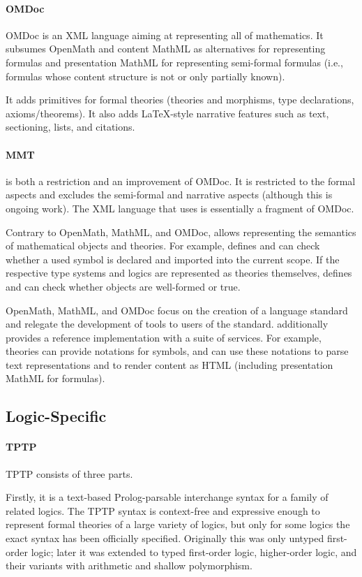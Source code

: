 \documentclass[12pt]{article}
\newcommand{\system}[2][]{\paragraph{#2}#2 \ifnonempty[\cite{#2}]{#1}{\cite{#1}}}
\begin{document}
\system{OMDoc} is an XML language aiming at representing all of mathematics.
It subsumes OpenMath and content MathML as alternatives for representing formulas and presentation MathML for representing semi-formal formulas (i.e., formulas whose content structure is not or only partially known).

It adds primitives for formal theories (theories and morphisms, type declarations, axioms/theorems).
It also adds LaTeX-style narrative features such as text, sectioning, lists, and citations.

\paragraph{MMT}
\mmt is both a restriction and an improvement of OMDoc.
It is restricted to the formal aspects and excludes the semi-formal and narrative aspects (although this is ongoing work).
The XML language that \mmt uses is essentially a fragment of OMDoc.

Contrary to OpenMath, MathML, and OMDoc, \mmt allows representing the semantics of mathematical objects and theories.
For example, \mmt defines and can check whether a used symbol is declared and imported into the current scope.
If the respective type systems and logics are represented as \mmt theories themselves, \mmt defines and can check whether objects are well-formed or true.

OpenMath, MathML, and OMDoc focus on the creation of a language standard and relegate the development of tools to users of the standard.
\mmt additionally provides a reference implementation with a suite of services.
For example, \mmt theories can provide notations for symbols, and \mmt can use these notations to parse text representations and to render content as HTML (including presentation MathML for formulas).

\subsection{Logic-Specific}

\system{TPTP} consists of three parts.

Firstly, it is a text-based Prolog-parsable interchange syntax for a family of related logics.
The TPTP syntax is context-free and expressive enough to represent formal theories of a large variety of logics, but only for some logics the exact syntax has been officially specified.
Originally this was only untyped first-order logic; later it was extended to typed first-order logic, higher-order logic, and their variants with arithmetic and shallow polymorphism.
\end{document}
